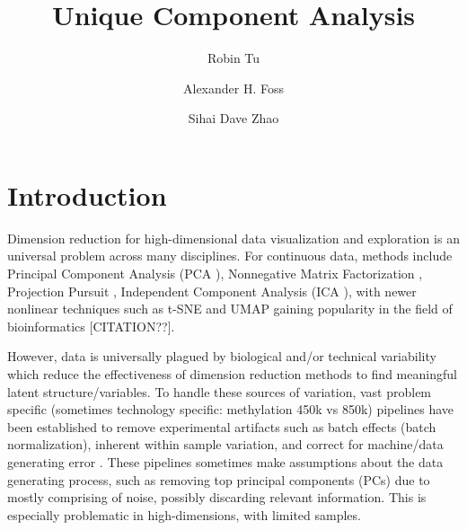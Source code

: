 \documentclass[12pt]{article}
\title{Unique Component Analysis}
\author[1]{Robin Tu}
\author[2]{ Alexander H. Foss }
\author[1]{Sihai Dave Zhao}
\affil[1]{Department of Statistics, University of Illinois at Urbana-Champaign, Champaign, IL}
\affil[2]{Statistical Sciences, Sandia National Laboratories, Albuquerque, NM}
\begin{document}
\maketitle

\section{Introduction}
Dimension reduction for high-dimensional data visualization and exploration is an universal problem across many disciplines. %
For continuous data, methods include Principal Component Analysis (PCA \cite{pca}), Nonnegative Matrix Factorization \cite{Lee1999}, Projection Pursuit \cite{pp}, Independent Component Analysis (ICA \cite{ica}), with newer nonlinear techniques such as t-SNE and UMAP gaining popularity in the field of bioinformatics [CITATION??]. %

However, data is universally plagued by biological and/or technical variability which reduce the effectiveness of dimension reduction methods to find meaningful latent structure/variables. To handle these sources of variation, vast problem specific (sometimes technology specific: methylation 450k vs 850k) pipelines have been established to remove experimental artifacts such as batch effects (batch normalization), inherent within sample variation, and correct for machine/data generating error \cite{Nguyen2019}. These pipelines sometimes make assumptions about the data generating process, such as removing top principal components (PCs) due to mostly comprising of noise, possibly discarding relevant information. This is especially problematic in high-dimensions, with limited samples.
\end{document}
